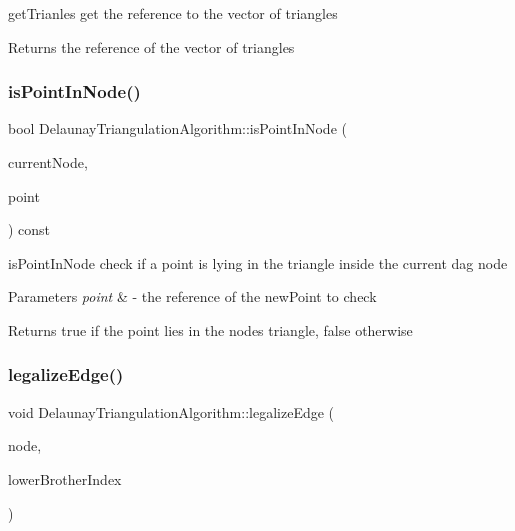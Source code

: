 get\+Trianles get the reference to the vector of triangles 

\begin{DoxyReturn}{Returns}
the reference of the vector of triangles 
\end{DoxyReturn}
\mbox{\label{classDelaunayTriangulationAlgorithm_a656aa7b63de6e6ccd1ce2063f0a5bbc9}} 
\subsubsection{\texorpdfstring{is\+Point\+In\+Node()}{isPointInNode()}}
{\footnotesize\ttfamily bool Delaunay\+Triangulation\+Algorithm\+::is\+Point\+In\+Node (\begin{DoxyParamCaption}\item[{\hyperlink{classDagNode}{Dag\+Node} $\ast$\&}]{current\+Node,  }\item[{const cg3\+::\+Point2\+Dd \&}]{point }\end{DoxyParamCaption}) const\hspace{0.3cm}{\ttfamily [inline]}}



is\+Point\+In\+Node check if a point is lying in the triangle inside the current dag node 


\begin{DoxyParams}{Parameters}
{\em point} & -\/ the reference of the new\+Point to check \\
\hline
\end{DoxyParams}
\begin{DoxyReturn}{Returns}
true if the point lies in the node\textquotesingle{}s triangle, false otherwise 
\end{DoxyReturn}
\mbox{\label{classDelaunayTriangulationAlgorithm_a350d489829dfbe0e141a967706bf6c53}} 
\subsubsection{\texorpdfstring{legalize\+Edge()}{legalizeEdge()}}
{\footnotesize\ttfamily void Delaunay\+Triangulation\+Algorithm\+::legalize\+Edge (\begin{DoxyParamCaption}\item[{\hyperlink{classDagNode}{Dag\+Node} $\ast$}]{node,  }\item[{size\+\_\+t}]{lower\+Brother\+Index }\end{DoxyParamCaption})}



